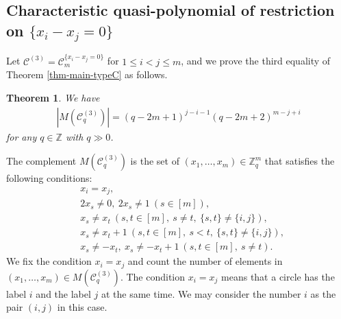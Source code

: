 \documentclass{article}
\theoremstyle{plain}
\newtheorem{Them}{Theorem}[section]
\theoremstyle{definition}
\theoremstyle{remark}
\numberwithin{equation}{section}
\newcommand{\Cc}{\mathcal{C}}
\begin{document}
\subsection{Characteristic quasi-polynomial of restriction on $\{x_i-x_j=0\}$}\label{sec-TypeC-rest-xi=xj}
Let $\Cc^{(3)}=\mathcal{C}_m^{\{x_i-x_j=0\}}$ for $1\leq i<j \leq m$, and we prove the third equality of Theorem \ref{thm-main-typeC} as follows.
\begin{Them}\label{thm-char-quasi-TypeC-xi=xj}
We have
\begin{align*}
\left|M(\Cc_q^{(3)})\right|=(q-2m+1)^{j-i-1}(q-2m+2)^{m-j+i}
\end{align*}
for any $q\in\mathbb{Z}$ with $q\gg 0$.
\end{Them}
The complement $M(\Cc^{(3)}_q)$ is the set of $(x_1,\dots,x_m)\in\mathbb{Z}_q^m$ that satisfies the following conditions:
\begin{align*}
&x_i=x_j,\\
&2x_s\neq 0,\ 2x_s\neq 1\ (s\in [m]),\\
&x_s\neq x_t\ (s,t\in [m],\ s\neq t,\ \{s,t\}\neq \{i,j\}),\\
&x_s\neq x_t+1\ (s,t\in [m],\ s<t,\ \{s,t\}\neq \{i,j\}),\\
&x_s\neq -x_t,\ x_s\neq -x_t+1\ (s,t\in [m],\ s\neq t).
\end{align*}
We fix the condition $x_i=x_j$ and count the number of elements in $(x_1,\dots,x_m)\in M(\Cc^{(3)}_q)$. %
The condition $x_i=x_j$ means that a circle has the label $i$ and the label $j$ at the same time.
We may consider the number $i$ as the pair $(i,j)$ in this case.
\end{document}
